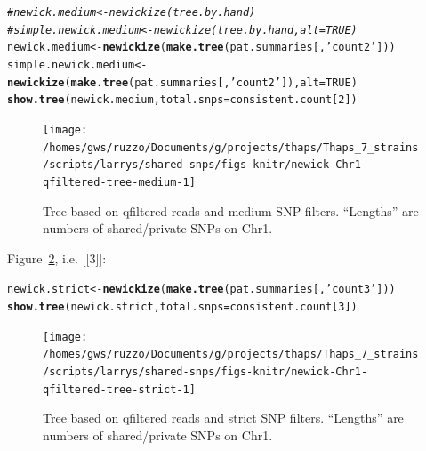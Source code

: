 \documentclass{article}\usepackage[]{graphicx}\usepackage[]{color}
\makeatletter
\newcommand{\hlnum}[1]{\textcolor[rgb]{0.686,0.059,0.569}{#1}}%
\newcommand{\hlstr}[1]{\textcolor[rgb]{0.192,0.494,0.8}{#1}}%
\newcommand{\hlcom}[1]{\textcolor[rgb]{0.678,0.584,0.686}{\textit{#1}}}%
\newcommand{\hlstd}[1]{\textcolor[rgb]{0.345,0.345,0.345}{#1}}%
\newcommand{\hlkwb}[1]{\textcolor[rgb]{0.69,0.353,0.396}{#1}}%
\newcommand{\hlkwc}[1]{\textcolor[rgb]{0.333,0.667,0.333}{#1}}%
\newcommand{\hlkwd}[1]{\textcolor[rgb]{0.737,0.353,0.396}{\textbf{#1}}}%
\newenvironment{kframe}{%
 \def\at@end@of@kframe{}%
 \ifinner\ifhmode%
  \def\at@end@of@kframe{\end{minipage}}%
  \begin{minipage}{\columnwidth}%
 \fi\fi%
 \def\FrameCommand##1{\hskip\@totalleftmargin \hskip-\fboxsep
 \colorbox{shadecolor}{##1}\hskip-\fboxsep
     \hskip-\linewidth \hskip-\@totalleftmargin \hskip\columnwidth}%
 \MakeFramed {\advance\hsize-\width
   \@totalleftmargin\z@ \linewidth\hsize
   \@setminipage}}%
 {\par\unskip\endMakeFramed%
 \at@end@of@kframe}
\newenvironment{knitrout}{}{} %
\makeatother
\begin{document}
\begin{knitrout}\scriptsize
{}\color{fgcolor}\begin{kframe}
\begin{alltt}
\hlcom{# newick.medium <- newickize(tree.by.hand)}
\hlcom{# simple.newick.medium <- newickize(tree.by.hand,alt=TRUE)}
\hlstd{newick.medium} \hlkwb{<-} \hlkwd{newickize}\hlstd{(}\hlkwd{make.tree}\hlstd{(pat.summaries[,}\hlstr{'count2'}\hlstd{]))}
\hlstd{simple.newick.medium} \hlkwb{<-} \hlkwd{newickize}\hlstd{(}\hlkwd{make.tree}\hlstd{(pat.summaries[,}\hlstr{'count2'}\hlstd{]),}\hlkwc{alt}\hlstd{=}\hlnum{TRUE}\hlstd{)}
\hlkwd{show.tree}\hlstd{(newick.medium,} \hlkwc{total.snps}\hlstd{=consistent.count[}\hlnum{2}\hlstd{])}
\end{alltt}
\end{kframe}\begin{figure}

{\centering \texttt{[image: /homes/gws/ruzzo/Documents/g/projects/thaps/Thaps\_7\_strains/scripts/larrys/shared-snps/figs-knitr/newick-Chr1-qfiltered-tree-medium-1]} 

}

\caption[Tree based on qfiltered reads and medium SNP filters]{Tree based on qfiltered reads and medium SNP filters.  ``Lengths'' are numbers of shared/private SNPs on Chr1.}\label{fig:tree-medium}
\end{figure}


\end{knitrout}

Figure~\ref{fig:tree-strict}, i.e. [[3]]:

\begin{knitrout}\scriptsize
{}\color{fgcolor}\begin{kframe}
\begin{alltt}
\hlstd{newick.strict} \hlkwb{<-} \hlkwd{newickize}\hlstd{(}\hlkwd{make.tree}\hlstd{(pat.summaries[,}\hlstr{'count3'}\hlstd{]))}
\hlkwd{show.tree}\hlstd{(newick.strict,} \hlkwc{total.snps}\hlstd{=consistent.count[}\hlnum{3}\hlstd{])}
\end{alltt}
\end{kframe}\begin{figure}

{\centering \texttt{[image: /homes/gws/ruzzo/Documents/g/projects/thaps/Thaps\_7\_strains/scripts/larrys/shared-snps/figs-knitr/newick-Chr1-qfiltered-tree-strict-1]} 

}

\caption[Tree based on qfiltered reads and strict SNP filters]{Tree based on qfiltered reads and strict SNP filters.  ``Lengths'' are numbers of shared/private SNPs on Chr1.}\label{fig:tree-strict}
\end{figure}


\end{knitrout}
\end{document}
